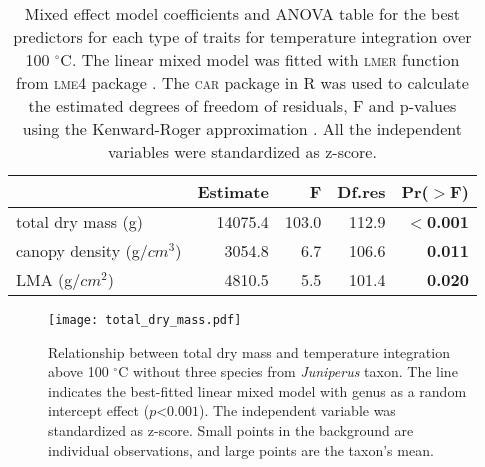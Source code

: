 \documentclass{bmcart}
\newcommand{\pkg}[1]{\textsc{#1}}
\begin{document}
\begin{table}
\centering
\caption{Mixed effect model coefficients and ANOVA table for the best predictors for each type of traits for temperature integration over 100 $^{\circ}$C. The linear mixed model was fitted with \pkg{lmer} function from \pkg{lme4} package \citep{bates2009package}. The \pkg{car} package in R \citep{fox2013hypothesis} was used to calculate the estimated degrees of freedom of residuals, F and p-values using the Kenward-Roger approximation \citep{kenward1997small}. All the independent variables were standardized  as z-score.}
\vspace{0.5 cm}
\begin{tabular}{lrrrr}
  \hline
 &  Estimate & F  & Df.res & Pr($>$F) \\ 
  \hline 
  total dry mass (g) & 14075.4 & 103.0  & 112.9 & \textbf{$<$0.001} \\ 
  canopy density (g/{$cm^3$}) & 3054.8 & 6.7  & 106.6 & \textbf{0.011} \\ 
  LMA (g/{$cm^2$}) & 4810.5 & 5.5 &  101.4 & \textbf{0.020} \\ 
   \hline
\end{tabular}
\label{tab:fandpstatfortemp}
\end{table}

\begin{figure}
    \centering
    \texttt{[image: total\_dry\_mass.pdf]}
    \caption[Dry mass effect on temperature integration]{\label{fig:dm-tempint}Relationship between total dry mass and temperature integration above 100 $^{\circ}$C without three species from \emph{Juniperus} taxon. The line indicates the best-fitted linear mixed model with genus as a random intercept effect ($p $<$ 0.001$). The independent variable was standardized as z-score. Small points in the background are individual observations, and large points are the taxon's mean.}
\end{figure}
\end{document}
